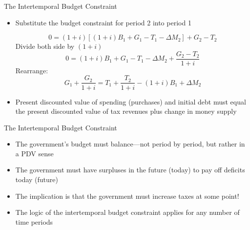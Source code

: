 \documentclass[aspectratio=1610]{beamer}
\begin{document}
\begin{frame}[wide]{The Intertemporal Budget Constraint}
	\begin{itemize}
		\item Substitute the budget constraint for period 2 into period 1
		
		\[0 = (1+i)\left[(1+i) B_1 +G_1 -T_1 -\Delta M_{2} \right] +G_2 -T_2\]
		Divide both side by $(1+i)$
		\[0 = (1+i) B_1 +G_1 -T_1 -\Delta M_{2} +\frac{G_2 -T_2}{1+i}\]
		Rearrange:
		\[G_1 + \frac{G_2}{1+i} = T_1 + \frac{T_2}{1+i} - (1+i)B_1 + \Delta M_{2}\]
		\vspace{1mm}
		\item Present discounted value of spending (purchases) and initial debt must equal the present discounted value of tax revenues plus change in money supply
	\end{itemize}
\end{frame}

\begin{frame}[wide]{The Intertemporal Budget Constraint}
	\begin{itemize}
%		
%		
		\item The government’s budget must balance—not period by period, but rather in a PDV sense
		\vspace{3mm}
		\item The government must have surpluses in the future (today) to pay off deficits today  (future)
		\vspace{3mm}
		\item The implication is that the government must increase taxes at some point!
		\vspace{3mm}
		\item The logic of the intertemporal budget constraint applies for any number of time periods
	\end{itemize}
\end{frame}
\end{document}

